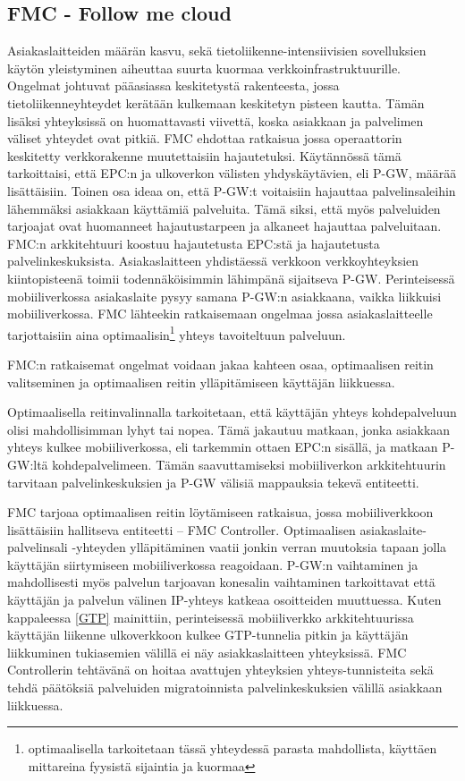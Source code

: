 \subsection{FMC - Follow me cloud}

Asiakaslaitteiden määrän kasvu, sekä tietoliikenne-intensiivisien sovelluksien käytön yleistyminen aiheuttaa suurta kuormaa verkkoinfrastruktuurille. Ongelmat johtuvat pääasiassa keskitetystä rakenteesta, jossa tietoliikenneyhteydet kerätään kulkemaan keskitetyn pisteen kautta. Tämän lisäksi yhteyksissä on huomattavasti viivettä, koska asiakkaan ja palvelimen väliset yhteydet ovat pitkiä. FMC ehdottaa ratkaisua jossa operaattorin keskitetty verkkorakenne muutettaisiin hajautetuksi. \cite{taleb2013follow}
Käytännössä tämä tarkoittaisi, että EPC:n ja ulkoverkon välisten yhdyskäytävien, eli P-GW, määrää lisättäisiin. 
Toinen osa ideaa on, että P-GW:t voitaisiin hajauttaa palvelinsaleihin lähemmäksi asiakkaan käyttämiä palveluita. Tämä siksi, että myös palveluiden tarjoajat ovat huomanneet hajautustarpeen ja alkaneet hajauttaa palveluitaan. 
FMC:n arkkitehtuuri koostuu hajautetusta EPC:stä ja hajautetusta palvelinkeskuksista. Asiakaslaitteen yhdistäessä verkkoon verkkoyhteyksien kiintopisteenä toimii todennäköisimmin lähimpänä sijaitseva P-GW. Perinteisessä mobiiliverkossa asiakaslaite pysyy samana P-GW:n asiakkaana, vaikka liikkuisi mobiiliverkossa. FMC lähteekin ratkaisemaan ongelmaa jossa asiakaslaitteelle tarjottaisiin aina optimaalisin\footnote{optimaalisella tarkoitetaan tässä yhteydessä parasta mahdollista, käyttäen mittareina fyysistä sijaintia ja kuormaa} yhteys tavoiteltuun palveluun.

FMC:n ratkaisemat ongelmat voidaan jakaa kahteen osaa, optimaalisen reitin valitseminen ja optimaalisen reitin ylläpitämiseen käyttäjän liikkuessa. 

Optimaalisella reitinvalinnalla tarkoitetaan, että käyttäjän yhteys kohdepalveluun olisi mahdollisimman lyhyt tai nopea. Tämä jakautuu matkaan, jonka asiakkaan yhteys kulkee mobiiliverkossa, eli tarkemmin ottaen EPC:n sisällä, ja matkaan P-GW:ltä kohdepalvelimeen. Tämän saavuttamiseksi mobiiliverkon arkkitehtuurin tarvitaan palvelinkeskuksien ja P-GW välisiä mappauksia tekevä entiteetti. 

FMC tarjoaa optimaalisen reitin löytämiseen ratkaisua, jossa mobiiliverkkoon lisättäisiin hallitseva entiteetti – FMC Controller. 
Optimaalisen asiakaslaite-palvelinsali -yhteyden ylläpitäminen vaatii jonkin verran muutoksia tapaan jolla käyttäjän siirtymiseen mobiiliverkossa reagoidaan. P-GW:n vaihtaminen ja mahdollisesti myös palvelun tarjoavan konesalin vaihtaminen tarkoittavat että käyttäjän ja palvelun välinen IP-yhteys katkeaa osoitteiden muuttuessa. Kuten kappaleessa \ref{GTP} mainittiin, perinteisessä mobiiliverkko arkkitehtuurissa käyttäjän liikenne ulkoverkkoon kulkee GTP-tunnelia pitkin ja käyttäjän liikkuminen tukiasemien välillä ei näy asiakkaslaitteen yhteyksissä. FMC Controllerin tehtävänä on hoitaa avattujen yhteyksien yhteys-tunnisteita sekä tehdä päätöksiä palveluiden migratoinnista palvelinkeskuksien välillä asiakkaan liikkuessa.

